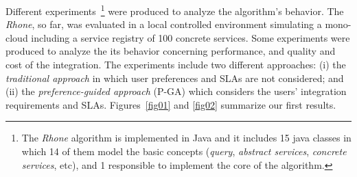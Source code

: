

Different experiments~\footnote{The \textit{Rhone} algorithm is implemented in
Java and it includes 15 java classes in which 14 of them model the basic concepts (\textit{query}, \textit{abstract services}, \textit{concrete services}, etc), 
and 1 responsible to implement the core of the algorithm. 
} were produced to analyze the algorithm's
behavior. The \textit{Rhone}, so far, was evaluated in a local controlled
environment simulating a mono-cloud including a service registry of 100 concrete
services. Some experiments were produced to analyze the its behavior
concerning performance, and quality and cost of the integration.
The experiments include two different approaches: (i) the \textit{traditional
approach} in which user preferences and SLAs are not considered; and (ii) the
\textit{preference-guided approach} (P-GA) which considers the users'
integration requirements and SLAs.
Figures~\ref{fig01} and \ref{fig02} summarize our first results.

